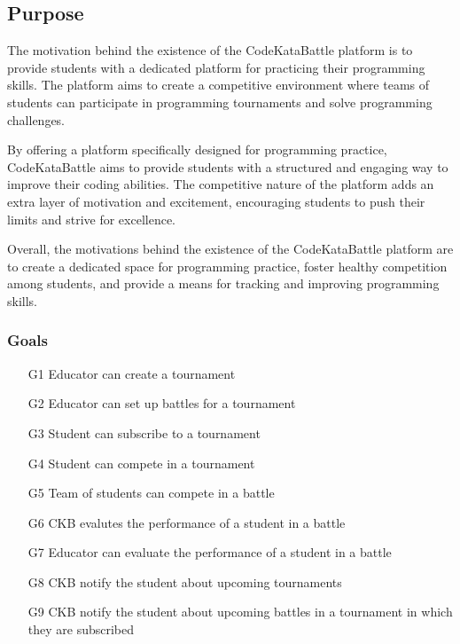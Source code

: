 \subsection{Purpose}
The motivation behind the existence of the CodeKataBattle platform is to provide students with a dedicated platform for practicing their programming skills. The platform aims to create a competitive environment where teams of students can participate in programming tournaments and solve programming challenges.

By offering a platform specifically designed for programming practice, CodeKataBattle aims to provide students with a structured and engaging way to improve their coding abilities. The competitive nature of the platform adds an extra layer of motivation and excitement, encouraging students to push their limits and strive for excellence.

Overall, the motivations behind the existence of the CodeKataBattle platform are to create a dedicated space for programming practice, foster healthy competition among students, and provide a means for tracking and improving programming skills.

\subsubsection{Goals}
\begin{enumerate}
    \item[G1] Educator can create a tournament
    \item[G2] Educator can set up battles for a tournament
    \item[G3] Student can subscribe to a tournament
    \item[G4] Student can compete in a tournament
    \item[G5] Team of students can compete in a battle
    \item[G6] CKB evalutes the performance of a student in a battle
    \item[G7] Educator can evaluate the performance of a student in a battle
    \item[G8] CKB notify the student about upcoming tournaments
    \item[G9] CKB notify the student about upcoming battles in a tournament in which they are subscribed
\end{enumerate}

